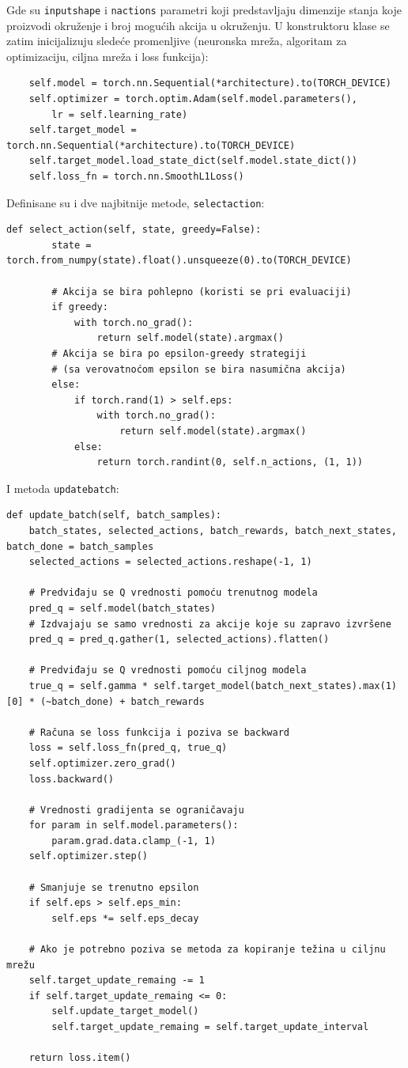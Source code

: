 \documentclass[a4paper,fleqn,12pt]{JMThesis}
\theoremstyle{plain}
\theoremstyle{definition}
\theoremstyle{definition}
\begin{document}
Gde su \texttt{input\textunderscore shape} i \texttt{n\textunderscore actions} parametri koji predstavljaju dimenzije stanja koje proizvodi okruženje
i broj mogućih akcija u okruženju.
U konstruktoru klase se zatim inicijalizuju sledeće promenljive (neuronska mreža, algoritam za optimizaciju, ciljna mreža i loss funkcija):
\begin{verbatim}
	self.model = torch.nn.Sequential(*architecture).to(TORCH_DEVICE)
	self.optimizer = torch.optim.Adam(self.model.parameters(), 
		lr = self.learning_rate)
	self.target_model = torch.nn.Sequential(*architecture).to(TORCH_DEVICE)
	self.target_model.load_state_dict(self.model.state_dict())
	self.loss_fn = torch.nn.SmoothL1Loss()
\end{verbatim}
Definisane su i dve najbitnije metode, \texttt{select\textunderscore action}:
\begin{verbatim}
def select_action(self, state, greedy=False):
        state = torch.from_numpy(state).float().unsqueeze(0).to(TORCH_DEVICE)
        
        # Akcija se bira pohlepno (koristi se pri evaluaciji)
        if greedy: 
            with torch.no_grad():
                return self.model(state).argmax()
        # Akcija se bira po epsilon-greedy strategiji 
		# (sa verovatnoćom epsilon se bira nasumična akcija)
        else:      
            if torch.rand(1) > self.eps:
                with torch.no_grad():
                    return self.model(state).argmax()
            else:
                return torch.randint(0, self.n_actions, (1, 1))
\end{verbatim}
I metoda \texttt{update\textunderscore batch}:
\begin{verbatim}
def update_batch(self, batch_samples):
	batch_states, selected_actions, batch_rewards, batch_next_states, batch_done = batch_samples
	selected_actions = selected_actions.reshape(-1, 1)

	# Predviđaju se Q vrednosti pomoću trenutnog modela
	pred_q = self.model(batch_states)
	# Izdvajaju se samo vrednosti za akcije koje su zapravo izvršene
	pred_q = pred_q.gather(1, selected_actions).flatten()

	# Predviđaju se Q vrednosti pomoću ciljnog modela 
	true_q = self.gamma * self.target_model(batch_next_states).max(1)[0] * (~batch_done) + batch_rewards

	# Računa se loss funkcija i poziva se backward
	loss = self.loss_fn(pred_q, true_q)
	self.optimizer.zero_grad()
	loss.backward()

	# Vrednosti gradijenta se ograničavaju
	for param in self.model.parameters():
		param.grad.data.clamp_(-1, 1)
	self.optimizer.step()

	# Smanjuje se trenutno epsilon
	if self.eps > self.eps_min:
		self.eps *= self.eps_decay

	# Ako je potrebno poziva se metoda za kopiranje težina u ciljnu mrežu
	self.target_update_remaing -= 1
	if self.target_update_remaing <= 0:
		self.update_target_model()
		self.target_update_remaing = self.target_update_interval

	return loss.item()
\end{verbatim}
\end{document}
